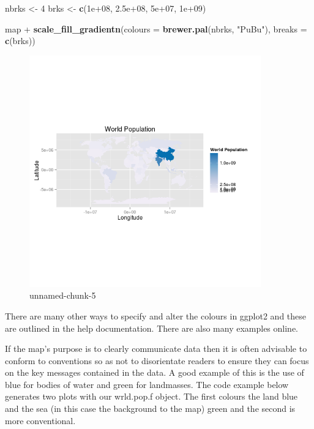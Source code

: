 \documentclass[]{article}
\newenvironment{Shaded}{}{}
\newcommand{\KeywordTok}[1]{\textcolor[rgb]{0.00,0.44,0.13}{\textbf{{#1}}}}
\newcommand{\DataTypeTok}[1]{\textcolor[rgb]{0.56,0.13,0.00}{{#1}}}
\newcommand{\DecValTok}[1]{\textcolor[rgb]{0.25,0.63,0.44}{{#1}}}
\newcommand{\FloatTok}[1]{\textcolor[rgb]{0.25,0.63,0.44}{{#1}}}
\newcommand{\StringTok}[1]{\textcolor[rgb]{0.25,0.44,0.63}{{#1}}}
\newcommand{\NormalTok}[1]{{#1}}
\let\Oldincludegraphics\includegraphics
\renewcommand{\includegraphics}[1]{\Oldincludegraphics[width=10cm]{#1}}
\begin{document}
\begin{Shaded}
\begin{Highlighting}[]
\NormalTok{nbrks <- }\DecValTok{4}
\NormalTok{brks <- }\KeywordTok{c}\NormalTok{(}\FloatTok{1e+08}\NormalTok{, }\FloatTok{2.5e+08}\NormalTok{, }\FloatTok{5e+07}\NormalTok{, }\FloatTok{1e+09}\NormalTok{)}

\NormalTok{map + }\KeywordTok{scale_fill_gradientn}\NormalTok{(}\DataTypeTok{colours =} \KeywordTok{brewer.pal}\NormalTok{(nbrks, }\StringTok{"PuBu"}\NormalTok{), }\DataTypeTok{breaks =} \KeywordTok{c}\NormalTok{(brks))}
\end{Highlighting}
\end{Shaded}
\begin{figure}[htbp]
\centering
\includegraphics{figure/unnamed-chunk-5.png}
\caption{unnamed-chunk-5}
\end{figure}

There are many other ways to specify and alter the colours in ggplot2
and these are outlined in the help documentation. There are also many
examples online.

If the map's purpose is to clearly communicate data then it is often
advisable to conform to conventions so as not to disorientate readers to
ensure they can focus on the key messages contained in the data. A good
example of this is the use of blue for bodies of water and green for
landmasses. The code example below generates two plots with our
wrld.pop.f object. The first colours the land blue and the sea (in this
case the background to the map) green and the second is more
conventional.
\end{document}
